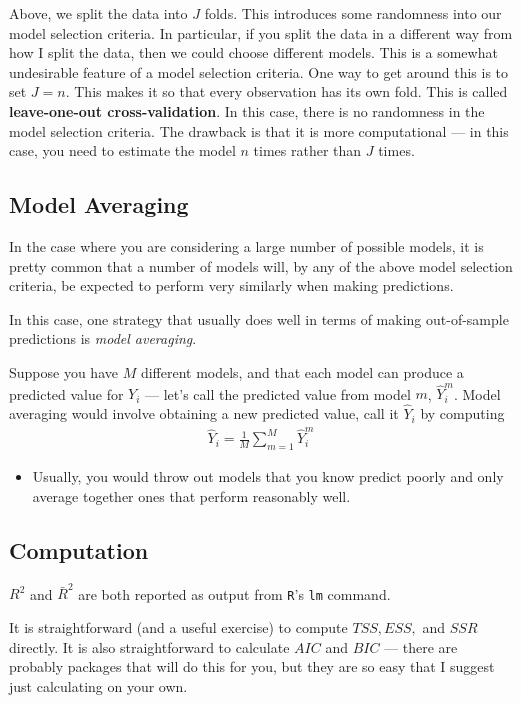 \documentclass[
  letterpaper,
  DIV=11,
  numbers=noendperiod]{scrreprt}
\providecommand{\tightlist}{%
  \setlength{\itemsep}{0pt}\setlength{\parskip}{0pt}}\usepackage{longtable,booktabs,array}
\begin{document}
Above, we split the data into \(J\) folds. This introduces some
randomness into our model selection criteria. In particular, if you
split the data in a different way from how I split the data, then we
could choose different models. This is a somewhat undesirable feature of
a model selection criteria. One way to get around this is to set
\(J=n\). This makes it so that every observation has its own fold. This
is called \textbf{leave-one-out cross-validation}. In this case, there
is no randomness in the model selection criteria. The drawback is that
it is more computational --- in this case, you need to estimate the
model \(n\) times rather than \(J\) times.

\subsection{Model Averaging}\label{model-averaging}

In the case where you are considering a large number of possible models,
it is pretty common that a number of models will, by any of the above
model selection criteria, be expected to perform very similarly when
making predictions.

In this case, one strategy that usually does well in terms of making
out-of-sample predictions is \emph{model averaging}.

Suppose you have \(M\) different models, and that each model can produce
a predicted value for \(Y_i\) --- let's call the predicted value from
model \(m\), \(\hat{Y}_i^m\). Model averaging would involve obtaining a
new predicted value, call it \(\hat{Y}_i\) by computing \begin{align*}
  \hat{Y}_i = \frac{1}{M} \sum_{m=1}^M \hat{Y}_i^m
\end{align*}

\begin{itemize}
\tightlist
\item
  Usually, you would throw out models that you know predict poorly and
  only average together ones that perform reasonably well.
\end{itemize}

\subsection{Computation}\label{computation-8}

\(R^2\) and \(\bar{R}^2\) are both reported as output from \texttt{R}'s
\texttt{lm} command.

It is straightforward (and a useful exercise) to compute \(TSS, ESS,\)
and \(SSR\) directly. It is also straightforward to calculate \(AIC\)
and \(BIC\) --- there are probably packages that will do this for you,
but they are so easy that I suggest just calculating on your own.
\end{document}
